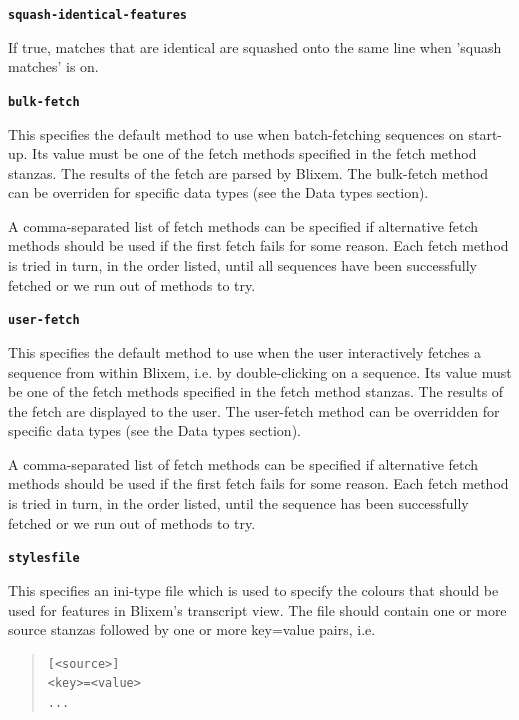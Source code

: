 \documentclass[letterpaper]{article}
\newcommand\textstyleSourceText[1]{\texttt{#1}}
\begin{document}
{\textstyleSourceText{\textrm{\textbf{squash-identical-features}}}\textbf{ }}

{If true, matches that are identical are squashed onto the same line when 'squash matches' is on.}

\bigskip

{\textstyleSourceText{\textrm{\textbf{bulk-fetch}}}\textbf{ }}

{This specifies the default method to use when batch-fetching sequences
on start-up. Its value must be one of the fetch methods specified in
the fetch method stanzas. The results of the fetch are parsed by
Blixem. The bulk-fetch method can be overriden for specific data types
(see the Data types section). }

\bigskip

{A comma-separated list of fetch methods can be specified if alternative
fetch methods should be used if the first fetch fails for some reason.
Each fetch method is tried in turn, in the order listed, until all
sequences have been successfully fetched or we run out of methods to
try.}

\bigskip

{\textstyleSourceText{\textrm{\textbf{user-fetch}}}\textbf{ }}
\label{section:user-fetch}

{This specifies the default method to use when the user interactively
fetches a sequence from within Blixem, i.e. by double-clicking on a
sequence. Its value must be one of the fetch methods specified in the
fetch method stanzas. The results of the fetch are displayed to the
user. The user-fetch method can be overridden for specific data types
(see the Data types section). }

\bigskip

{A comma-separated list of fetch methods can be specified if alternative
fetch methods should be used if the first fetch fails for some reason.
Each fetch method is tried in turn, in the order listed, until the
sequence has been successfully fetched or we run out of methods to try.}

\bigskip

{\textstyleSourceText{\textrm{\textbf{stylesfile}}}\textbf{ }}

This specifies an ini-type file which is used to specify the colours that should be used for features in Blixem's transcript view. The file should contain one or more source stanzas followed by one or more key=value pairs, i.e.

\begin{quote}
\begin{verbatim}
[<source>]
<key>=<value>
...
\end{verbatim}
\end{quote}
\end{document}
